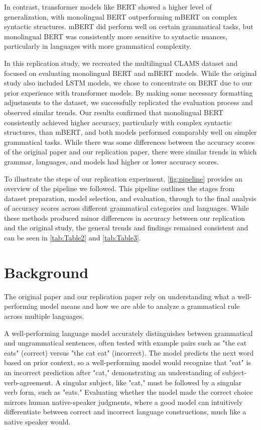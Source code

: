 \documentclass[11pt]{article}
\begin{document}
In contrast, transformer models like BERT showed a higher level of generalization, with monolingual BERT outperforming mBERT on complex syntactic structures. mBERT did perform well on certain grammatical tasks, but monolingual BERT was consistently more sensitive to syntactic nuances, particularly in languages with more grammatical complexity.

In this replication study, we recreated the multilingual CLAMS dataset and focused on evaluating monolingual BERT and mBERT models. While the original study also included LSTM models, we chose to concentrate on BERT due to our prior experience with transformer models. By making some necessary formatting adjustments to the dataset, we successfully replicated the evaluation process and observed similar trends. Our results confirmed that monolingual BERT consistently achieved higher accuracy, particularly with complex syntactic structures, than mBERT, and both models performed comparably well on simpler grammatical tasks. While there was some differences between the accuracy scores of the original paper and our replication paper, there were similar trends in which grammar, languages, and models had higher or lower accuracy scores.

To illustrate the steps of our replication experiment, \autoref{fig:pipeline} provides an overview of the pipeline we followed. This pipeline outlines the stages from dataset preparation, model selection, and evaluation, through to the final analysis of accuracy scores across different grammatical categories and languages. While these methods produced minor differences in accuracy between our replication and the original study, the general trends and findings remained consistent and can be seen in \autoref{tab:Table2} and \autoref{tab:Table3}.

\section{Background}
The original paper and our replication paper rely on understanding what a well-performing model means and how we are able to analyze a grammatical rule across multiple languages.

A well-performing language model accurately distinguishes between grammatical and ungrammatical sentences, often tested with example pairs such as "the cat eats" (correct) versus "the cat eat" (incorrect). The model predicts the next word based on prior context, so a well-performing model would recognize that "eat" is an incorrect prediction after "cat," demonstrating an understanding of subject-verb-agreement. A singular subject, like "cat," must be followed by a singular verb form, such as "eats." Evaluating whether the model made the correct choice mirrors human native-speaker judgments, where a good model can intuitively differentiate between correct and incorrect language constructions, much like a native speaker would.
\end{document}
